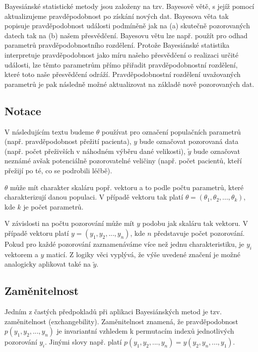 Bayesiánské statistické metody jsou založeny na tzv. Bayesově větě, s jejíž pomocí aktualizujeme pravděpodobnost po získání nových dat. Bayesova věta tak popisuje pravděpodobnost události podmíněně jak na (a) skutečně pozorovaných datech tak na (b) našem přesvědčení. Bayesovu větu lze např. použít pro odhad parametrů pravděpodobnostního rozdělení. Protože Bayesiánské statistika interpretuje pravděpodobnost jako míru našeho přesvědčení o realizaci určité události, lze těmto parametrům přímo přiřadit pravděpodobnostní rozdělení, které toto naše přesvědčení odráží. Pravděpodobnostní rozdělení uvažovaných parametrů je pak následně možné aktualizovat na základě nově pozorovaných dat.

\subsection{Notace}

V následujícím textu budeme $\theta$ používat pro označení populačních parametrů (např. pravděpodobnost přežití pacienta), $y$ bude označovat pozorovaná data (např. počet přeživších v náhodném výběru dané velikosti), $\tilde{y}$ bude označovat neznámé avšak potenciálně pozorovatelné veličiny (např. počet pacientů, kteří přežijí po té, co se podrobili léčbě).

$\theta$ může mít charakter skaláru popř. vektoru a to podle počtu parametrů, které charakterizují danou populaci. V případě vektoru tak platí $\theta = (\theta_1, \theta_2, ..., \theta_k)$, kde $k$ je počet parametrů.

V závislosti na počtu pozorování může mít $y$ podobu jak skaláru tak vektoru. V případě vektoru platí $y = (y_1, y_2, ..., y_n)$, kde $n$ představuje počet pozorování. Pokud pro každé pozorování zaznamenáváme více než jednu charakteristiku, je $y_i$ vektorem a $y$ maticí. Z logiky věci vyplývá, že výše uvedené značení je možné analogicky aplikovat také na $\tilde{y}$.

\subsection{Zaměnitelnost}

Jedním z častých předpokladů při aplikaci Bayesiánských metod je tzv. zaměnitelnost (exchangebility). Zaměnitelnost znamená, že pravděpodobnost $p(y_1, y_2, ..., y_n)$ je invariantní vzhledem k permutacím indexů jednotlivých pozorování $y_i$. Jinými slovy např. platí $p(y_1, y_2, ..., y_n) = y(y_2, y_n, ..., y_1)$.

